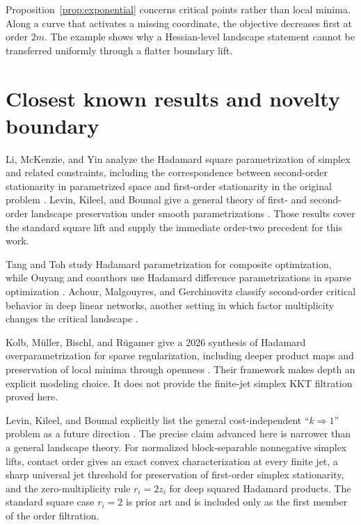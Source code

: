 \documentclass[11pt]{article}
\theoremstyle{definition}
\theoremstyle{remark}
\begin{document}
Proposition~\ref{prop:exponential} concerns critical points rather than local
minima. Along a curve that activates a missing coordinate, the objective
decreases first at order $2m$. The example shows why a Hessian-level landscape
statement cannot be transferred uniformly through a flatter boundary lift.

\section{Closest known results and novelty boundary}\label{sec:related}

Li, McKenzie, and Yin analyze the Hadamard square parametrization of simplex
and related constraints, including the correspondence between second-order
stationarity in parametrized space and first-order stationarity in the
original problem \cite{LiMcKenzieYin2023}. Levin, Kileel, and Boumal give a
general theory of first- and second-order landscape preservation under smooth
parametrizations \cite{LevinKileelBoumal2024}. Those results cover the standard
square lift and supply the immediate order-two precedent for this work.

Tang and Toh study Hadamard parametrization for composite optimization, while
Ouyang and coauthors use Hadamard difference parametrizations in sparse
optimization \cite{TangToh2024,OuyangEtAl2024}. Achour, Malgouyres, and
Gerchinovitz classify second-order critical behavior in deep linear networks,
another setting in which factor multiplicity changes the critical landscape
\cite{AchourMalgouyresGerchinovitz2021}.

Kolb, M\"uller, Bischl, and R\"ugamer give a 2026 synthesis of Hadamard
overparametrization for sparse regularization, including deeper product maps
and preservation of local minima through openness
\cite{KolbEtAl2026}. Their framework makes depth an explicit modeling choice.
It does not provide the finite-jet simplex KKT filtration proved here.

Levin, Kileel, and Boumal explicitly list the general cost-independent
``$k\Rightarrow1$'' problem as a future direction
\cite{LevinKileelBoumal2024}. The precise claim advanced here is narrower than
a general landscape theory.
For normalized block-separable nonnegative simplex lifts, contact order gives
an exact convex characterization at every finite jet, a sharp universal jet
threshold for preservation of first-order simplex stationarity, and the
zero-multiplicity rule $r_i=2z_i$ for deep squared Hadamard products. The
standard square case $r_i=2$ is prior art and is included only as the first
member of the order filtration.
\end{document}
